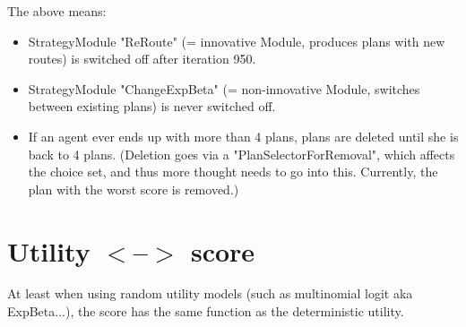 The above means:
\begin{itemize}
	\item StrategyModule "ReRoute" (= innovative Module, produces plans with new routes) is switched off after iteration 950.
	\item StrategyModule "ChangeExpBeta" (= non-innovative Module, switches between existing plans) is never switched off.
	\item If an agent ever ends up with more than 4 plans, plans are deleted  until she is back to 4 plans. (Deletion goes via a  "PlanSelectorForRemoval", which affects the choice set, and thus more  thought needs to go into this. Currently, the plan with the worst  score is removed.)
\end{itemize}

\vfill\eject
\section{Utility $<$--$>$ score}


At least when using random utility models (such as multinomial logit   aka ExpBeta...), the score has the same function as the deterministic   utility.
